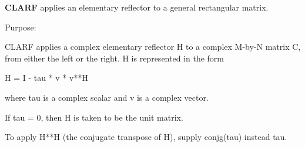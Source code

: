 {\bfseries C\+L\+A\+R\+F} applies an elementary reflector to a general rectangular matrix. 

 \begin{DoxyParagraph}{Purpose\+: }
\begin{DoxyVerb} CLARF applies a complex elementary reflector H to a complex M-by-N
 matrix C, from either the left or the right. H is represented in the
 form

       H = I - tau * v * v**H

 where tau is a complex scalar and v is a complex vector.

 If tau = 0, then H is taken to be the unit matrix.

 To apply H**H (the conjugate transpose of H), supply conjg(tau) instead
 tau.\end{DoxyVerb}
 
\end{DoxyParagraph}

